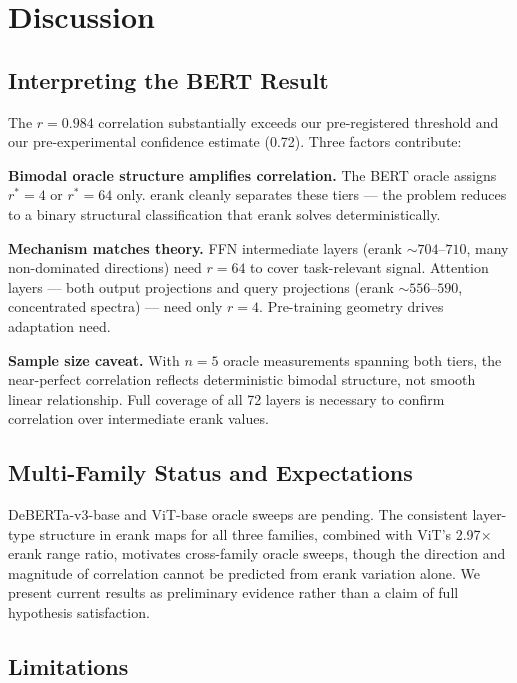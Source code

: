 \section{Discussion}
\label{sec:discussion}

\subsection{Interpreting the BERT Result}

The $r = 0.984$ correlation substantially exceeds our pre-registered threshold and our pre-experimental confidence estimate (0.72). Three factors contribute:

\textbf{Bimodal oracle structure amplifies correlation.} The BERT oracle assigns $r^* = 4$ or $r^* = 64$ only. erank cleanly separates these tiers --- the problem reduces to a binary structural classification that erank solves deterministically.

\textbf{Mechanism matches theory.} FFN intermediate layers (erank $\sim 704$--$710$, many non-dominated directions) need $r=64$ to cover task-relevant signal. Attention layers --- both output projections and query projections (erank $\sim 556$--$590$, concentrated spectra) --- need only $r=4$. Pre-training geometry drives adaptation need.

\textbf{Sample size caveat.} With $n=5$ oracle measurements spanning both tiers, the near-perfect correlation reflects deterministic bimodal structure, not smooth linear relationship. Full coverage of all 72 layers is necessary to confirm correlation over intermediate erank values.

\subsection{Multi-Family Status and Expectations}

DeBERTa-v3-base and ViT-base oracle sweeps are pending. The consistent layer-type structure in erank maps for all three families, combined with ViT's 2.97$\times$ erank range ratio, motivates cross-family oracle sweeps, though the direction and magnitude of correlation cannot be predicted from erank variation alone. We present current results as preliminary evidence rather than a claim of full hypothesis satisfaction.

\subsection{Limitations}

